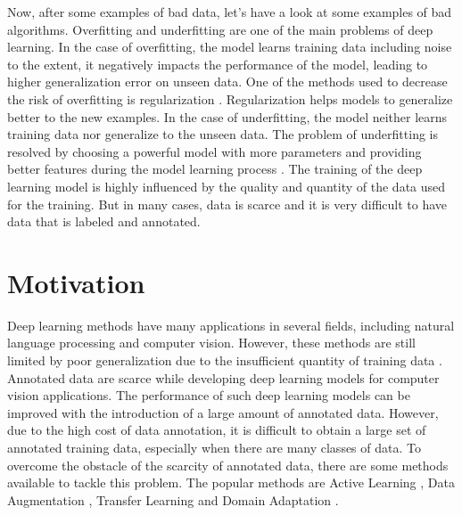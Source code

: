 Now, after some examples of bad data, let's have a look at some examples of bad algorithms. Overfitting and underfitting are one of the main problems of deep learning. In the case of overfitting, the model learns training data including noise to the extent, it negatively impacts the performance of the model, leading to higher generalization error on unseen data. One of the methods used to decrease the risk of overfitting is regularization \cite{kukacka2017regularization}. Regularization helps models to generalize better to the new examples. In the case of underfitting, the model neither learns training data nor generalize to the unseen data. The problem of underfitting is resolved by choosing a powerful model with more parameters and providing better features during the model learning process \cite{10.5555/3153997}. The training of the deep learning model is highly influenced by the quality and quantity of the data used for the training. But in many cases, data is scarce and it is very difficult to have data that is labeled and annotated.





\section{Motivation}\label{motivation}

Deep learning methods have many applications in several fields, including natural language processing and computer vision. However, these methods are still limited by poor generalization due to the insufficient quantity of training data \cite{8978087}. Annotated data are scarce while developing deep learning models for computer vision applications. The performance of such deep learning models can be improved with the introduction of a large amount of annotated data. However, due to the high cost of data annotation, it is difficult to obtain a large set of annotated training data, especially when there are many classes of data. To overcome the obstacle of the scarcity of annotated data, there are some methods available to tackle this problem. The popular methods are Active Learning \cite{hemmer2020deal}, Data Augmentation \cite{Shorten.2019}, Transfer Learning \cite{zhuang2020comprehensive} and Domain Adaptation \cite{redko2020survey}. 

